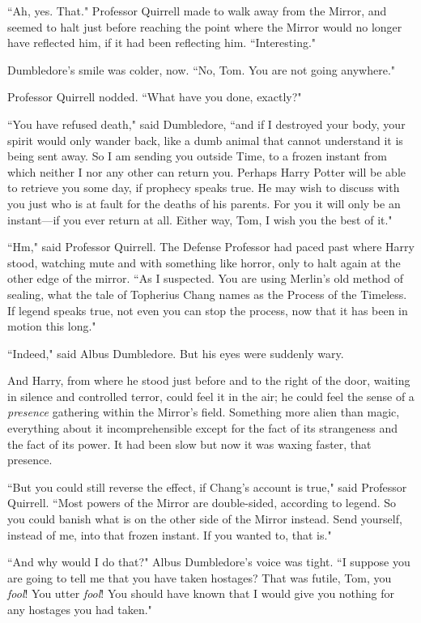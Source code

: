 ``Ah, yes. That." Professor Quirrell made to walk away from the Mirror, and seemed to halt just before reaching the point where the Mirror would no longer have reflected him, if it had been reflecting him. ``Interesting."

Dumbledore's smile was colder, now. ``No, Tom. You are not going anywhere."

Professor Quirrell nodded. ``What have you done, exactly?"

``You have refused death," said Dumbledore, ``and if I destroyed your body, your spirit would only wander back, like a dumb animal that cannot understand it is being sent away. So I am sending you outside Time, to a frozen instant from which neither I nor any other can return you. Perhaps Harry Potter will be able to retrieve you some day, if prophecy speaks true. He may wish to discuss with you just who is at fault for the deaths of his parents. For you it will only be an instant—if you ever return at all. Either way, Tom, I wish you the best of it."

``Hm," said Professor Quirrell. The Defense Professor had paced past where Harry stood, watching mute and with something like horror, only to halt again at the other edge of the mirror. ``As I suspected. You are using Merlin's old method of sealing, what the tale of Topherius Chang names as the Process of the Timeless. If legend speaks true, not even you can stop the process, now that it has been in motion this long."

``Indeed," said Albus Dumbledore. But his eyes were suddenly wary.

And Harry, from where he stood just before and to the right of the door, waiting in silence and controlled terror, could feel it in the air; he could feel the sense of a \emph{presence} gathering within the Mirror's field. Something more alien than magic, everything about it incomprehensible except for the fact of its strangeness and the fact of its power. It had been slow but now it was waxing faster, that presence.

``But you could still reverse the effect, if Chang's account is true," said Professor Quirrell. ``Most powers of the Mirror are double-sided, according to legend. So you could banish what is on the other side of the Mirror instead. Send yourself, instead of me, into that frozen instant. If you wanted to, that is."

``And why would I do that?" Albus Dumbledore's voice was tight. ``I suppose you are going to tell me that you have taken hostages? That was futile, Tom, you \emph{fool}! You utter \emph{fool}! You should have known that I would give you nothing for any hostages you had taken."

